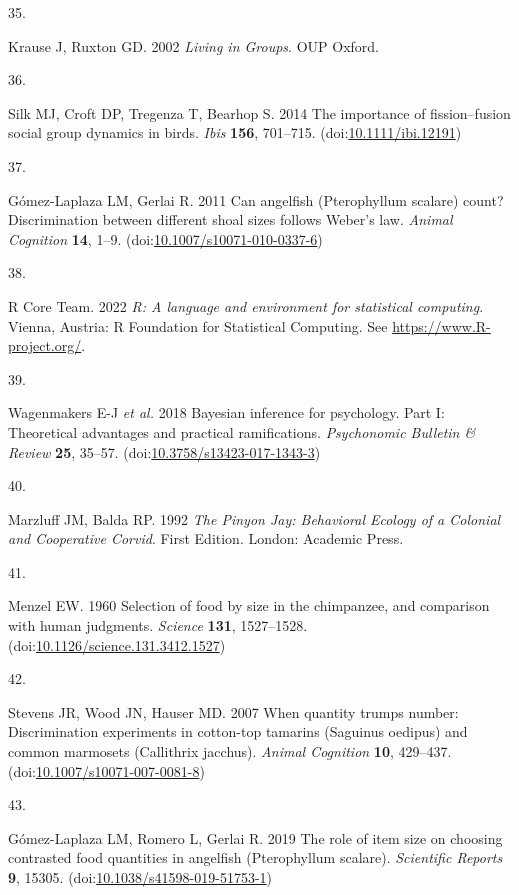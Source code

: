 \documentclass[
  ,doc,floatsintext]{apa6}
\newlength{\cslhangindent}
\newlength{\csllabelwidth}
\newlength{\cslentryspacingunit} %
\newenvironment{CSLReferences}[2] %
 {%
  \setlength{\parindent}{0pt}
  \ifodd #1
  \let\oldpar\par
  \def\par{\hangindent=\cslhangindent\oldpar}
  \fi
  \setlength{\parskip}{#2\cslentryspacingunit}
 }%
 {}
\newcommand{\CSLLeftMargin}[1]{\parbox[t]{\csllabelwidth}{#1}}
\newcommand{\CSLRightInline}[1]{\parbox[t]{\linewidth - \csllabelwidth}{#1}\break}
\begin{document}
\begin{CSLReferences}{0}{0}
\leavevmode{}%
\CSLLeftMargin{35. }%
\CSLRightInline{Krause J, Ruxton GD. 2002 \emph{Living in {Groups}}. OUP Oxford. }

\leavevmode{}%
\CSLLeftMargin{36. }%
\CSLRightInline{Silk MJ, Croft DP, Tregenza T, Bearhop S. 2014 The importance of fission--fusion social group dynamics in birds. \emph{Ibis} \textbf{156}, 701--715. (doi:\href{https://doi.org/10.1111/ibi.12191}{10.1111/ibi.12191})}

\leavevmode{}%
\CSLLeftMargin{37. }%
\CSLRightInline{Gómez-Laplaza LM, Gerlai R. 2011 Can angelfish ({Pterophyllum} scalare) count? {Discrimination} between different shoal sizes follows {Weber}'s law. \emph{Animal Cognition} \textbf{14}, 1--9. (doi:\href{https://doi.org/10.1007/s10071-010-0337-6}{10.1007/s10071-010-0337-6})}

\leavevmode{}%
\CSLLeftMargin{38. }%
\CSLRightInline{R Core Team. 2022 \emph{R: A language and environment for statistical computing}. Vienna, Austria: R Foundation for Statistical Computing. See \url{https://www.R-project.org/}.}

\leavevmode{}%
\CSLLeftMargin{39. }%
\CSLRightInline{Wagenmakers E-J \emph{et al.} 2018 Bayesian inference for psychology. {Part} {I}: {Theoretical} advantages and practical ramifications. \emph{Psychonomic Bulletin \& Review} \textbf{25}, 35--57. (doi:\href{https://doi.org/10.3758/s13423-017-1343-3}{10.3758/s13423-017-1343-3})}

\leavevmode{}%
\CSLLeftMargin{40. }%
\CSLRightInline{Marzluff JM, Balda RP. 1992 \emph{The {Pinyon} {Jay}: {Behavioral} {Ecology} of a {Colonial} and {Cooperative} {Corvid}}. First Edition. London: Academic Press. }

\leavevmode{}%
\CSLLeftMargin{41. }%
\CSLRightInline{Menzel EW. 1960 Selection of food by size in the chimpanzee, and comparison with human judgments. \emph{Science} \textbf{131}, 1527--1528. (doi:\href{https://doi.org/10.1126/science.131.3412.1527}{10.1126/science.131.3412.1527})}

\leavevmode{}%
\CSLLeftMargin{42. }%
\CSLRightInline{Stevens JR, Wood JN, Hauser MD. 2007 When quantity trumps number: Discrimination experiments in cotton-top tamarins ({Saguinus} oedipus) and common marmosets ({Callithrix} jacchus). \emph{Animal Cognition} \textbf{10}, 429--437. (doi:\href{https://doi.org/10.1007/s10071-007-0081-8}{10.1007/s10071-007-0081-8})}

\leavevmode{}%
\CSLLeftMargin{43. }%
\CSLRightInline{Gómez-Laplaza LM, Romero L, Gerlai R. 2019 The role of item size on choosing contrasted food quantities in angelfish ({Pterophyllum} scalare). \emph{Scientific Reports} \textbf{9}, 15305. (doi:\href{https://doi.org/10.1038/s41598-019-51753-1}{10.1038/s41598-019-51753-1})}

\end{CSLReferences}
\end{document}
